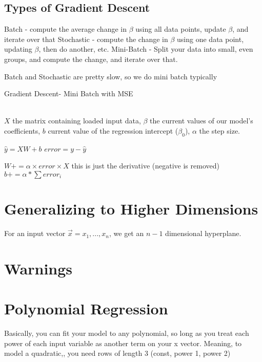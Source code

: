 \documentclass{article}
\begin{document}
\subsection{Types of Gradient Descent}
Batch - compute the average change in $\beta$ using all data points, update $\beta$, and iterate over that
Stochastic - compute the change in $\beta$ using one data point, updating $\beta$, then do another, etc.
Mini-Batch - Split your data into small, even groups, and compute the change, and iterate over that.

Batch and Stochastic are pretty slow, so we do mini batch typically
\begin{algorithm}
	\caption{Gradient Descent- Mini Batch with MSE}
	\begin{algorithmic}
		\\
			 \Comment $X$ the matrix containing loaded input data, $\beta$ the current values of our model's coefficients, $b$ current value of the regression intercept ($\beta_0$), $\alpha$ the step size. 
			 
			 $\hat{y} = XW + b$
			 $error = y - \hat{y}$
			 
			 $W += \alpha\times error\times X$ \Comment this is just the derivative (negative is removed)
			 $b += \alpha * \sum error_i$
		\EndProcedure
	\end{algorithmic}
\end{algorithm}

\section{Generalizing to Higher Dimensions}

For an input vector $\vec{x} = x_1, ..., x_n$, we get an $n-1$ dimensional hyperplane.

\section{Warnings}

\section{Polynomial Regression}
Basically, you can fit your model to any polynomial, so long as you treat each power of each input variable as another term on your x vector. Meaning, to model a quadratic,, you need rows of length 3 (const, power 1, power 2)
\end{document}
